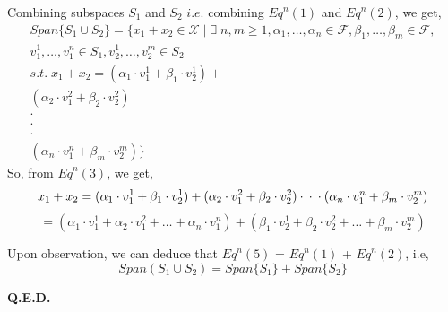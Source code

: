 \documentclass[a4paper]{article}
\begin{document}
\begin{qalist}
			Combining subspaces ${S}_{1}$ and ${S}_{2}$ $i.e.$ combining ${Eq}^{n}(1)$ and ${Eq}^{n}(2)$, we get, 
			\begin{equation}
				\begin{aligned}
					Span\{{S}_{1} \cup {S}_{2}\} = 
					\bigl\{{x}_{1}+{x}_{2} \in \mathcal{X} \; |\;\exists \; n,m \geq 1 , {\alpha}_{1}, \ldots, {\alpha}_{n} \in \mathcal{F}, {\beta}_{1}, \ldots, {\beta}_{m} \in \mathcal{F},  \\
					{v}^{1}_{1}, \ldots, {v}^{n}_{1} \in {S}_{1}, {v}^{1}_{2}, \ldots, {v}^{m}_{2} \in {S}_{2} \\
					 s.t. \; {x}_{1} + {x}_{2} = ({\alpha}_{1}\cdot{v}^{1}_{1} + {\beta}_{1}\cdot{v}^{1}_{2}) +  \\
					 ({\alpha}_{2}\cdot{v}^{2}_{1} +  {\beta}_{2}\cdot{v}^{2}_{2}) \\
					 \cdot  \\
					 \cdot \\
					 \cdot  \\
					 ({\alpha}_{n}\cdot{v}^{n}_{1} + {\beta}_{m}\cdot{v}^{m}_{2})\bigr\}
				\end{aligned}
			\end{equation} 
			So, from ${Eq}^{n}(3)$, we get, 
			\begin{equation}
				{x}_{1} + {x}_{2} = ({\alpha}_{1}\cdot{v}^{1}_{1} + {\beta}_{1}\cdot{v}^{1}_{2}) +\\
				 ({\alpha}_{2}\cdot{v}^{2}_{1} +  {\beta}_{2}\cdot{v}^{2}_{2}) \\
				 \cdot\\
				 \cdot\\
				 \cdot\\
				 ({\alpha}_{n}\cdot{v}^{n}_{1} + {\beta}_{m}\cdot{v}^{m}_{2})
			\end{equation}
			\begin{equation}
				= ({\alpha}_{1}\cdot{v}^{1}_{1} + {\alpha}_{2}\cdot{v}^{2}_{1} + \ldots  + {\alpha}_{n}\cdot{v}^{n}_{1}) +
				 ( {\beta}_{1}\cdot{v}^{1}_{2} +  {\beta}_{2}\cdot{v}^{2}_{2} + \ldots + {\beta}_{m}\cdot{v}^{m}_{2})
			\end{equation}			
			
			Upon observation, we can deduce that  ${Eq}^{n}(5)$ =  ${Eq}^{n}(1)$ +  ${Eq}^{n}(2)$, i.e,
			\begin{equation}
				Span({S}_{1} \cup {S}_{2}) = Span\{{S}_{1}\} + Span\{{S}_{2}\}
			\end{equation}
			
			\textbf{Q.E.D.}
			

\end{qalist}
\end{document}
